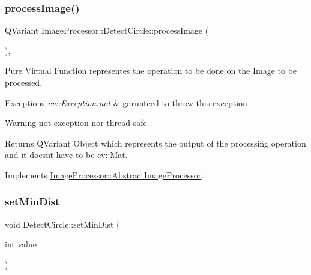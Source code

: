 \subsubsection{\texorpdfstring{process\+Image()}{processImage()}\hspace{0.1cm}{\footnotesize\ttfamily [2/2]}}
{\footnotesize\ttfamily Q\+Variant Image\+Processor\+::\+Detect\+Circle\+::process\+Image (\begin{DoxyParamCaption}{ }\end{DoxyParamCaption})\hspace{0.3cm}{\ttfamily [override]}, {\ttfamily [virtual]}}



Pure Virtual Function representes the operation to be done on the Image to be processed. 


\begin{DoxyExceptions}{Exceptions}
{\em cv\+::\+Exception.\+not} & garunteed to throw this exception \\
\hline
\end{DoxyExceptions}
\begin{DoxyWarning}{Warning}
not exception nor thread safe. 
\end{DoxyWarning}
\begin{DoxyReturn}{Returns}
Q\+Variant Object which represents the output of the processing operation and it doesn\textquotesingle{}t have to be cv\+::\+Mat. 
\end{DoxyReturn}


Implements \hyperlink{class_image_processor_1_1_abstract_image_processor_ad033ae911918b0f6842b7b1d6cdd2b90}{Image\+Processor\+::\+Abstract\+Image\+Processor}.

\mbox{\label{class_image_processor_1_1_detect_circle_a09bb7bbe753372179b49f94370800021}} 
\subsubsection{\texorpdfstring{set\+Min\+Dist}{setMinDist}}
{\footnotesize\ttfamily void Detect\+Circle\+::set\+Min\+Dist (\begin{DoxyParamCaption}\item[{int}]{value }\end{DoxyParamCaption})\hspace{0.3cm}{\ttfamily [slot]}}



